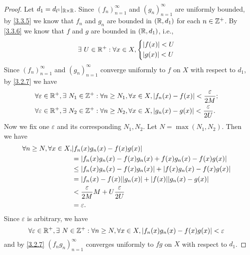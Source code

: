 \begin{proof}
  Let \(d_1 = d_{l^1}|_{\mathbb{R} \times \mathbb{R}}\).
  Since \((f_n)_{n = 1}^\infty\) and \((g_n)_{n = 1}^\infty\) are uniformly bounded, by \cref{3.3.5} we know that \(f_n\) and \(g_n\) are bounded in \((\mathbb{R}, d_1)\) for each \(n \in \mathbb{Z}^+\).
  By \cref{3.3.6} we know that \(f\) and \(g\) are bounded in \((\mathbb{R}, d_1)\), i.e.,
  \[
    \exists\ U \in \mathbb{R}^+ : \forall x \in X, \begin{dcases}
      \left\lvert f(x)\right\rvert < U \\
      \left\lvert g(x)\right\rvert < U
    \end{dcases}
  \]
  Since \((f_n)_{n = 1}^\infty\) and \((g_n)_{n = 1}^\infty\) converge uniformly to \(f\) on \(X\) with respect to \(d_1\), by \cref{3.2.7} we have
  \begin{align*}
     & \forall \varepsilon \in \mathbb{R}^+, \exists\ N_1 \in \mathbb{Z}^+ : \forall n \geq N_1, \forall x \in X, \left\lvert f_n(x) - f(x)\right\rvert < \dfrac{\varepsilon}{2M}; \\
     & \forall \varepsilon \in \mathbb{R}^+, \exists\ N_2 \in \mathbb{Z}^+ : \forall n \geq N_2, \forall x \in X, \left\lvert g_n(x) - g(x)\right\rvert < \dfrac{\varepsilon}{2U}.
  \end{align*}
  Now we fix one \(\varepsilon\) and its corresponding \(N_1, N_2\).
  Let \(N = \max(N_1, N_2)\).
  Then we have
  \begin{align*}
    \forall n \geq N, \forall x \in X, & \abs{f_n(x) g_n(x) - f(x) g(x)}                                        \\
                                       & = \abs{f_n(x) g_n(x) - f(x) g_n(x) + f(x) g_n(x) - f(x) g(x)}          \\
                                       & \leq \abs{f_n(x) g_n(x) - f(x) g_n(x)} + \abs{f(x) g_n(x) - f(x) g(x)} \\
                                       & = \abs{f_n(x) - f(x)} \abs{g_n(x)} + \abs{f(x)} \abs{g_n(x) - g(x)}    \\
                                       & < \dfrac{\varepsilon}{2M} M + U \dfrac{\varepsilon}{2U}                \\
                                       & = \varepsilon.
  \end{align*}
  Since \(\varepsilon\) is arbitrary, we have
  \[
    \forall \varepsilon \in \mathbb{R}^+, \exists\ N \in \mathbb{Z}^+ : \forall n \geq N, \forall x \in X, \left\lvert f_n(x) g_n(x) - f(x) g(x)\right\rvert < \varepsilon
  \]
  and by \cref{3.2.7} \((f_n g_n)_{n = 1}^\infty\) converges uniformly to \(fg\) on \(X\) with respect to \(d_1\).
\end{proof}